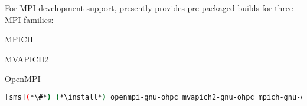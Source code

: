 For MPI development support, \OHPC{} presently provides pre-packaged builds for
three MPI families: 

\begin{itemize*}
\item MPICH
\item MVAPICH2
\item OpenMPI

\end{itemize*}

\begin{lstlisting}[language=bash]
[sms](*\#*) (*\install*) openmpi-gnu-ohpc mvapich2-gnu-ohpc mpich-gnu-ohpc
\end{lstlisting}
